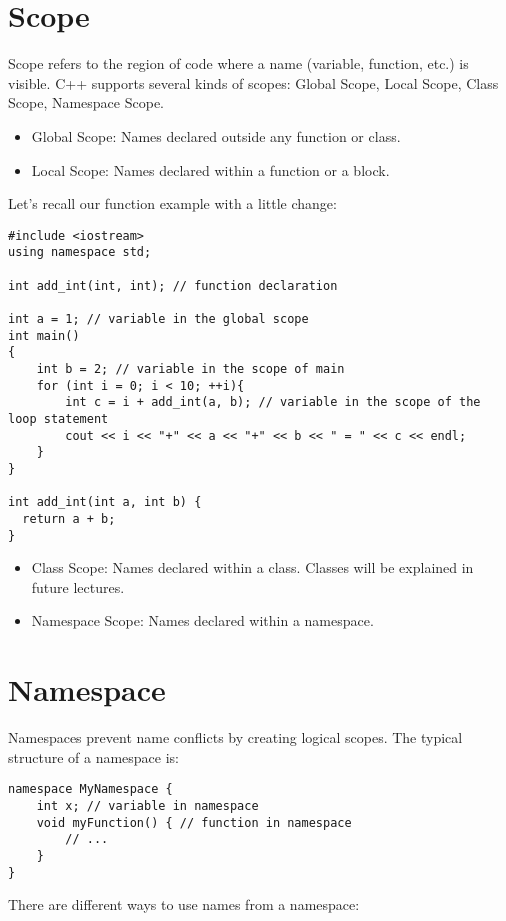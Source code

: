 \documentclass{article}
\begin{document}
\section{Scope}
Scope refers to the region of code where a name (variable, function, etc.) is visible. C++ supports several kinds of scopes: Global Scope, Local Scope, Class Scope, Namespace Scope.

\begin{itemize}
    \item Global Scope: Names declared outside any function or class.
    \item Local Scope: Names declared within a function or a block.
\end{itemize}

Let's recall our function example with a little change:
\begin{verbatim}
#include <iostream>
using namespace std;

int add_int(int, int); // function declaration

int a = 1; // variable in the global scope
int main()
{
    int b = 2; // variable in the scope of main
    for (int i = 0; i < 10; ++i){
        int c = i + add_int(a, b); // variable in the scope of the loop statement
        cout << i << "+" << a << "+" << b << " = " << c << endl;
    }
}

int add_int(int a, int b) {
  return a + b; 
}
\end{verbatim}

\begin{itemize}
    \item Class Scope: Names declared within a class. Classes will be explained in future lectures.
    \item Namespace Scope: Names declared within a namespace.
\end{itemize}



\section{Namespace}
Namespaces prevent name conflicts by creating logical scopes. The typical structure of a namespace is:

\begin{verbatim}
namespace MyNamespace {
    int x; // variable in namespace
    void myFunction() { // function in namespace
        // ...
    }
}
\end{verbatim}
There are different ways to use names from a namespace:
\end{document}
